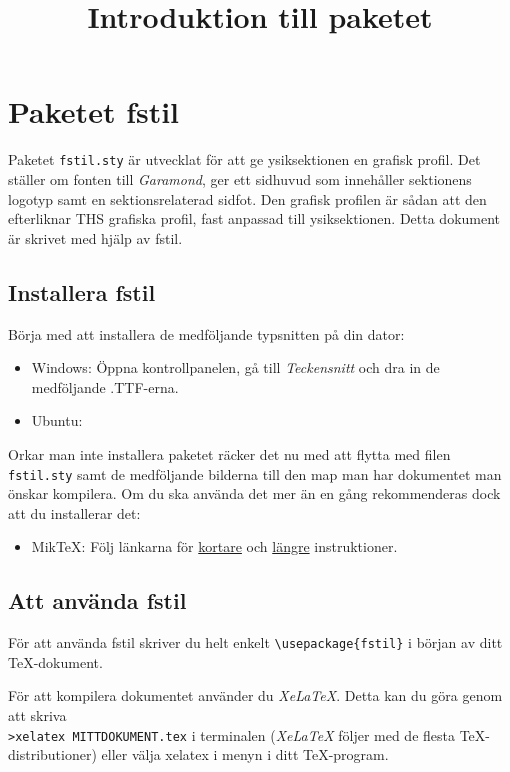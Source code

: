 \documentclass[a4paper]{article}
\title{Introduktion till paketet  \NoCaseChange{\texttt{fstil.sty}} }
\date{}
\author{}
\newcommand{\bs}{\textbackslash}
\begin{document}
\ftitlepage
\ftoc
\section{Paketet fstil}
Paketet \texttt{fstil.sty} är utvecklat för att ge \F ysiksektionen en grafisk profil. Det ställer om fonten till \textit{Garamond}, ger ett sidhuvud som innehåller sektionens logotyp samt en sektionsrelaterad sidfot. Den grafisk profilen är sådan att den efterliknar THS grafiska profil, fast anpassad till \F ysiksektionen. Detta dokument är skrivet med hjälp av fstil.

\subsection{Installera fstil}
Börja med att installera de medföljande typsnitten på din dator:
\begin{itemize}
\item[] Windows: Öppna kontrollpanelen, gå till \textit{Teckensnitt} och dra in de medföljande .TTF-erna.
\item[] Ubuntu:
\end{itemize}

Orkar man inte installera paketet räcker det nu med att flytta med filen \texttt{fstil.sty} samt de medföljande bilderna till den map man har dokumentet man önskar kompilera. Om du ska använda det mer än en gång rekommenderas dock att du installerar det:
\begin{itemize}
\item[] MikTeX: Följ länkarna för \href{http://docs.miktex.org/faq/maintenance.html#styfiles}{kortare} och \href{http://docs.miktex.org/manual/localadditions.html}{längre} instruktioner.
\end{itemize}

\subsection{Att använda fstil}
För att använda fstil skriver du helt enkelt \texttt{\bs usepackage\{fstil\}} i början av ditt \TeX-dokument.

För att kompilera dokumentet använder du \textit{XeLaTeX}. Detta kan du göra genom att skriva \\ \texttt{>xelatex MITTDOKUMENT.tex} i terminalen (\textit{XeLaTeX} följer med de flesta \TeX-distributioner) eller välja xelatex i menyn i ditt \TeX-program.
\end{document}
